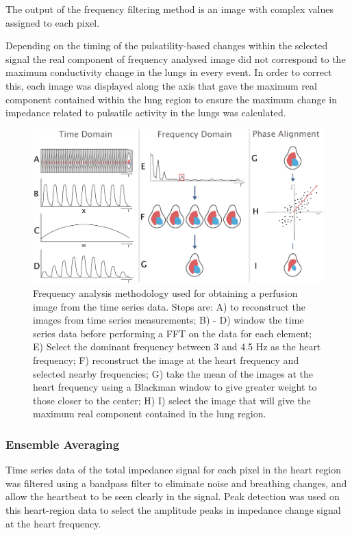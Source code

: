 The output of the frequency filtering method is an 
image with complex values assigned to each pixel.  

Depending on the timing of the pulsatility-based changes within the selected signal
the real component of frequency analysed image 
did not correspond to the maximum conductivity 
change in the lungs in every event.
In order to correct this, each image was displayed along the axis 
that gave the maximum real component contained
within the lung region to ensure
the maximum change in impedance related to pulsatile activity in the lungs was calculated.

\begin{figure}
\includegraphics[width=\textwidth]{chapter3-perfusion_analysis/imgs/fig-methodsFrequency.pdf}
\caption[Frequency analysis methods]{
Frequency analysis methodology used for obtaining a perfusion image 
from the time series data. Steps are: 
A) to reconstruct the images from time series measurements; 
B) - D) window the time series data before performing a 
FFT on the data for each element; 
E) Select the dominant frequency between 3 and 4.5 Hz as the heart frequency;
F) reconstruct the image at the heart frequency and selected nearby frequencies; 
G) take the mean of the images at the heart frequency using a Blackman window 
to give greater weight to those closer to the center; 
H) I) select the image that will give the maximum real component contained
in the lung region.
}
\label{fig:freqAnalysis}
\end{figure}

\subsubsection{Ensemble Averaging}

Time series data of the total impedance signal for each pixel in the heart region was filtered 
using a bandpass filter to eliminate noise and breathing changes, 
and allow the heartbeat to be seen clearly in the signal.
Peak detection was used on this heart-region data
to select the amplitude peaks in impedance change
signal at the heart frequency.

